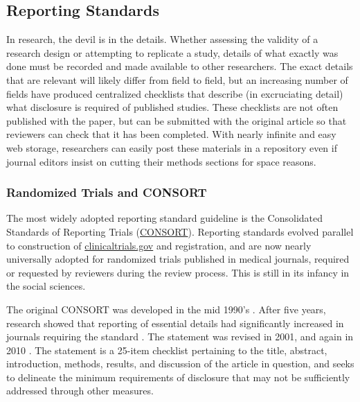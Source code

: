 \documentclass[12pt] {article}
\begin{document}
\subsection{Reporting Standards}\label{reporting-standards}
In research, the devil is in the details. Whether assessing the validity of a research design or attempting to replicate a study, details of what exactly was done must be recorded and made available to other researchers. The exact details that are relevant will likely differ from field to field, but an increasing number of fields have
produced centralized checklists that describe (in excruciating detail) what disclosure is required of published studies. These checklists are not often published with the paper, but can be submitted with the original article so that reviewers can check that it has been completed. With nearly infinite and easy web storage, researchers can easily post these materials in a repository even if journal editors insist on cutting their methods sections for space reasons. 

\subsubsection{Randomized Trials and CONSORT}\label{randomized-trials}
The most widely adopted reporting standard guideline is the Consolidated Standards of Reporting Trials (\href{http://www.consort-statement.org}{CONSORT}). Reporting standards evolved parallel to construction of \href{http://clinicaltrials.gov}{clinicaltrials.gov} and registration, and are now nearly universally adopted for randomized trials published in medical journals, required or requested by reviewers during the review process. This is still in its infancy in the social sciences.

The original CONSORT  was developed in the mid 1990's \citep{begg_c_improving_1996}. After five years, research showed that reporting of essential details had significantly increased in journals requiring the standard  \citep{moher_d_use_2001}. The statement was revised in 2001, and again in 2010  \citep{moher_consort_2001, schulz_consort_2010}. The statement is a 25-item checklist pertaining to the title, abstract, introduction, methods, results, and discussion of the article in question, and seeks to delineate the minimum requirements of disclosure that may not be sufficiently addressed through other measures.
\end{document}
